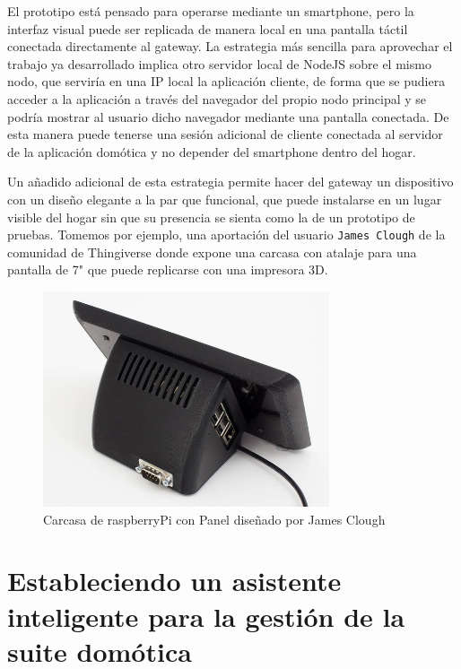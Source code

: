 El prototipo está pensado para operarse mediante un smartphone, pero la interfaz visual puede ser replicada de manera local en una pantalla táctil conectada directamente al \gls{gateway}. La estrategia más sencilla para aprovechar el trabajo ya desarrollado implica otro servidor local de NodeJS sobre el mismo nodo, que serviría en una IP local la aplicación cliente, de forma que se pudiera acceder a la aplicación a través del navegador del propio nodo principal y se podría mostrar al usuario dicho navegador mediante una pantalla conectada. De esta manera puede tenerse una sesión adicional de cliente conectada al servidor de la aplicación domótica y no depender del smartphone dentro del hogar.

\vspace{1cm}

Un añadido adicional de esta estrategia permite hacer del \gls{gateway} un dispositivo con un diseño elegante a la par que funcional, que puede instalarse en un lugar visible del hogar sin que su presencia se sienta como la de un prototipo de pruebas. Tomemos por ejemplo, una aportación del usuario \verb|James Clough| de la comunidad de Thingiverse\cite{raspberry_case_7} donde expone una carcasa con atalaje para una pantalla de 7" que puede replicarse con una impresora 3D.

\begin{figure}[hbt!]
\centering
\includegraphics[height=2.5in]{figures/raspberrypicase7_preview_featured.jpg}
\caption[Carcasa de raspberryPi con Panel]{Carcasa de raspberryPi con Panel diseñado por James Clough\footnotemark}
\end{figure}

\section{Estableciendo un asistente inteligente para la gestión de la suite domótica}
\label{ch:Capitulo6.5}

